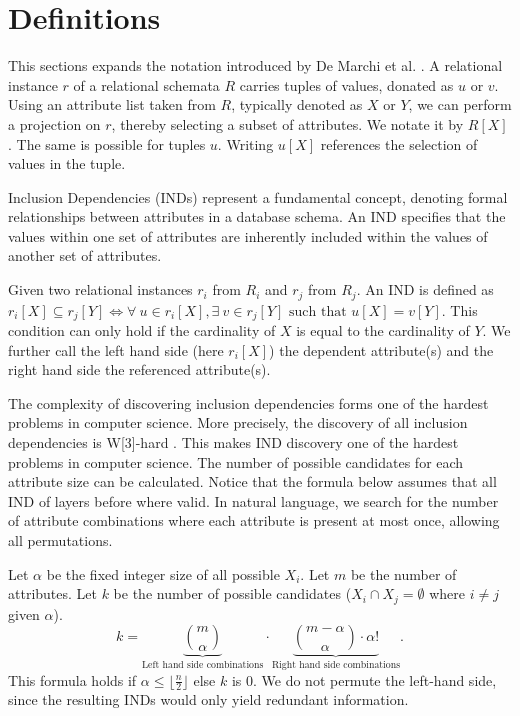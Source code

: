 \section{Definitions}
This sections expands the notation introduced by De Marchi et al. \cite{marchi2009unary}. A relational instance $r$ of a relational schemata $R$ carries tuples of values, donated as $u$ or $v$. Using an attribute list taken from $R$, typically denoted as $X$ or $Y$, we can perform a projection on $r$, thereby selecting a subset of attributes. We notate it by $R[X]$. The same is possible for tuples $u$. Writing $u[X]$ references the selection of values in the tuple.

Inclusion Dependencies (INDs) represent a fundamental concept, denoting formal relationships between attributes in a database schema. An IND specifies that the values within one set of attributes are inherently included within the values of another set of attributes.

\begin{definition}\label{def:inds}
    Given two relational instances $r_i$ from $R_i$ and $r_j$ from $R_j$. An IND is defined as $r_i[X] \subseteq r_j[Y] \iff \forall \: u \in r_i[X], \exists \: v \in r_j[Y] \text{ such that } u[X] = v[Y]$. This condition can only hold if the cardinality of $X$ is equal to the cardinality of $Y$. We further call the left hand side (here $r_i[X]$) the dependent attribute(s) and the right hand side the referenced attribute(s).
\end{definition}

The complexity of discovering inclusion dependencies forms one of the hardest problems in computer science. More precisely, the discovery of all inclusion dependencies is W[3]-hard \cite{blasius2017parameterized}. This makes IND discovery one of the hardest problems in computer science. The number of possible candidates for each attribute size can be calculated. Notice that the formula below assumes that all IND of layers before where valid. In natural language, we search for the number of attribute combinations where each attribute is present at most once, allowing all permutations.

\begin{definition}\label{def:candidates}
    Let $\alpha$ be the fixed integer size of all possible $X_i$. Let $m$ be the number of attributes. Let $k$ be the number of possible candidates ($X_i \cap X_j = \emptyset$ where $i \not = j$ given $\alpha$).
    \[
        k = \underbrace{\binom{m}{\alpha}}_{\text{Left hand side combinations}} \cdot \underbrace{\binom{m-\alpha}{\alpha}\cdot \alpha!}_\text{Right hand side combinations}.
    \]
    This formula holds if $\alpha \leq \lfloor \frac{n}{2} \rfloor$ else $k$ is $0$. We do not permute the left-hand side, since the resulting INDs would only yield redundant information.
\end{definition}

